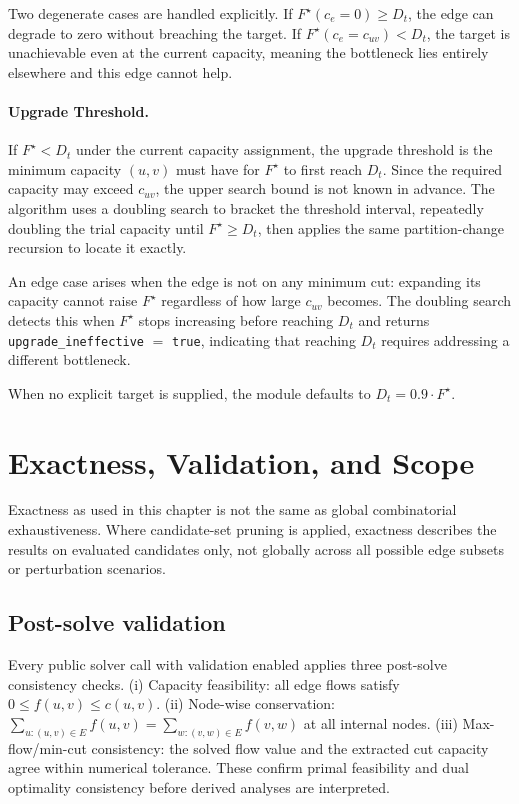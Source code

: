 \documentclass[12pt]{report}
\begin{document}
Two degenerate cases are handled explicitly. If $F^\star(c_e = 0) \geq D_t$, the edge can degrade to zero without breaching the target. If $F^\star(c_e = c_{uv}) < D_t$, the target is unachievable even at the current capacity, meaning the bottleneck lies entirely elsewhere and this edge cannot help.

\paragraph{Upgrade Threshold.}
If $F^\star < D_t$ under the current capacity assignment, the upgrade threshold is the minimum capacity $(u,v)$ must have for $F^\star$ to first reach $D_t$. Since the required capacity may exceed $c_{uv}$, the upper search bound is not known in advance. The algorithm uses a doubling search to bracket the threshold interval, repeatedly doubling the trial capacity until $F^\star \geq D_t$, then applies the same partition-change recursion to locate it exactly.

An edge case arises when the edge is not on any minimum cut: expanding its capacity cannot raise $F^\star$ regardless of how large $c_{uv}$ becomes. The doubling search detects this when $F^\star$ stops increasing before reaching $D_t$ and returns \texttt{upgrade\_ineffective} $=$ \texttt{true}, indicating that reaching $D_t$ requires addressing a different bottleneck. 

When no explicit target is supplied, the module defaults to $D_t = 0.9 \cdot F^\star$.


\section{Exactness, Validation, and Scope}

Exactness as used in this chapter is not the same as global combinatorial exhaustiveness. Where candidate-set pruning is applied, exactness describes the results on evaluated candidates only, not globally 
across all possible edge subsets or perturbation scenarios.

\subsection{Post-solve validation}
Every public solver call with validation enabled applies three post-solve consistency checks. (i) Capacity feasibility: all edge flows satisfy $0\le f(u,v)\le c(u,v)$. (ii) Node-wise conservation: $\sum_{u:(u,v)\in E} f(u,v) = \sum_{w:(v,w)\in E} f(v,w)$ at all internal nodes. (iii) Max-flow/min-cut consistency: the solved flow value and the extracted cut capacity agree within numerical tolerance. These confirm primal feasibility and dual optimality consistency before derived analyses are interpreted.
\end{document}
